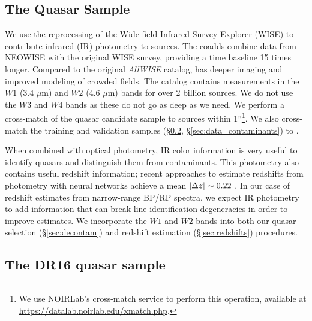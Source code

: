 \subsection{The \unWISE Quasar Sample}
\label{sec:data_wise}

We use the \unWISE reprocessing \citep{lang_unwise_2014,meisner_unwise_2019} of the Wide-field Infrared Survey Explorer (WISE) \citep{wright_wide-field_2010} to contribute infrared (IR) photometry to \Gaia sources.
The \unWISE coadds combine data from NEOWISE \citep{mainzer_preliminary_2011} with the original WISE survey, providing a time baseline 15 times longer.
Compared to the original \textsl{AllWISE} catalog, \unWISE has deeper imaging and improved modeling of crowded fields.
The \unWISE catalog \citep{schlafly_unwise_2019} contains measurements in the $W1$ (3.4 $\mu$m) and  $W2$ (4.6 $\mu$m) bands for over 2 billion sources.
We do not use the $W3$ and $W4$ bands as these do not go as deep as we need.
We perform a cross-match of the \Gaia quasar candidate sample to \unWISE sources within 1''\footnote{We use NOIRLab's cross-match service to perform this operation, available at \url{https://datalab.noirlab.edu/xmatch.php}.}.
We also cross-match the \SDSS training and validation samples (\S\ref{sec:data_sdss_quasars}, \S\ref{sec:data_contaminants}) to \unWISE.

When combined with optical photometry, \unWISE IR color information is very useful to identify quasars and distinguish them from contaminants.
This photometry also contains useful redshift information; recent approaches to estimate redshifts from photometry with neural networks achieve a mean $|\Delta z|\sim 0.22$ \citep{yang_quasar_2017, jin_efficient_2019, kunsagi-mate_photometric_2022}.
In our case of redshift estimates from narrow-range BP/RP spectra, we expect IR photometry to add information that can break line identification degeneracies in order to improve estimates.
We incorporate the $W1$ and $W2$ bands into both our quasar selection (\S\ref{sec:decontam}) and redshift estimation (\S\ref{sec:redshifts}) procedures.


\subsection{The \SDSS DR16 quasar sample}
\label{sec:data_sdss_quasars}

